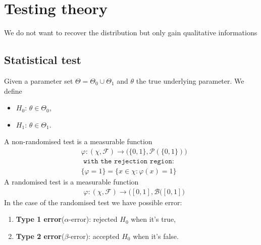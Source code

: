 \section{Testing theory}
We do not want to recover the distribution but only gain qualitative informations
\subsection{Statistical test}
\begin{definition}
Given a parameter set $\Theta = \Theta_0 \cup \Theta_1$ and $\theta$ the true underlying parameter. We define
\begin{itemize}
	\item $H_0$: $\theta \in \Theta_0$, 
	\item $H_1$: $\theta \in \Theta_1$.
\end{itemize} 
A non-randomised test is a measurable function
\begin{align*}
	&\varphi: (\chi, \mathcal{F}) \rightarrow \bigg(\{0, 1\}, \mathcal{P}(\{0, 1\}) \bigg)\\
	&\texttt{ with the rejection region:}\\
	&\{\varphi = 1\} = \{ x \in \chi: \varphi(x) = 1\}
\end{align*}
A randomised test is a measurable function
\begin{align*}
	&\varphi:(\chi, \mathcal{F}) \rightarrow \bigg([0, 1], \mathcal{B}([0, 1]\bigg)
\end{align*}
In the case of the randomised test we have possible error:
\begin{enumerate}
	\item \textbf{Type 1 error}($\alpha$-error): rejected $H_0$ when it's true,
	\item \textbf{Type 2 error}($\beta$-error): accepted $H_0$ when it's false. 
\end{enumerate}
\end{definition}

